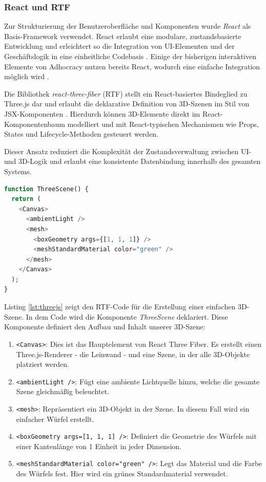 \subsubsection{React und RTF}

Zur Strukturierung der Benutzeroberfläche und Komponenten wurde \textit{React} als Basis-Framework verwendet. React erlaubt eine modulare, zustandsbasierte Entwicklung und erleichtert so die Integration von UI-Elementen und der Geschäftslogik in eine einheitliche Codebasis \parencite{metaplatformsinc.React2025}. Einige der bisherigen interaktiven Elemente von Adhocracy nutzen bereits React, wodurch eine einfache Integration möglich wird \parencite{liquiddemocracye.v.Adhocracy4Adhocracy4Maps_react2025}.

\medskip

Die Bibliothek \textit{react-three-fiber} (RTF) stellt ein React-basiertes Bindeglied zu Three.js dar und erlaubt die deklarative Definition von 3D-Szenen im Stil von JSX-Komponenten \parencite{poimandresReactThreeFiber2024}. Hierdurch können 3D-Elemente direkt im React-Komponentenbaum modelliert und mit React-typischen Mechanismen wie Props, States und Lifecycle-Methoden gesteuert werden.

Dieser Ansatz reduziert die Komplexität der Zustandsverwaltung zwischen UI- und 3D-Logik und erlaubt eine konsistente Datenbindung innerhalb des gesamten Systems.

\begin{lstlisting}[frame=htrbl, caption={Three.js Beispiel-Szene}, label={lst:threejs}, language=php]
function ThreeScene() {
  return (
    <Canvas>
      <ambientLight />
      <mesh>
        <boxGeometry args={[1, 1, 1]} />
        <meshStandardMaterial color="green" />
      </mesh>
    </Canvas>
  );
}
\end{lstlisting}

Listing \ref{lst:threejs} zeigt den RTF-Code für die Erstellung einer einfachen 3D-Szene. In dem Code wird die Komponente \textit{ThreeScene} deklariert. Diese Komponente definiert den Aufbau und Inhalt unserer 3D-Szene:

\begin{enumerate}
\item \texttt{<Canvas>}: Dies ist das Hauptelement von React Three Fiber. Es erstellt einen Three.js-Renderer - die Leinwand - und eine Szene, in der alle 3D-Objekte platziert werden.
\item \texttt{<ambientLight />}: Fügt eine ambiente Lichtquelle hinzu, welche die gesamte Szene gleichmäßig beleuchtet.
\item \texttt{<mesh>}: Repräsentiert ein 3D-Objekt in der Szene. In diesem Fall wird ein einfacher Würfel erstellt.
\item \texttt{<boxGeometry args={[1, 1, 1]} />}: Definiert die Geometrie des Würfels mit einer Kantenlänge von 1 Einheit in jeder Dimension.
\item \texttt{<meshStandardMaterial color="green" />}: Legt das Material und die Farbe des Würfels fest. Hier wird ein grünes Standardmaterial verwendet.
\end{enumerate}

